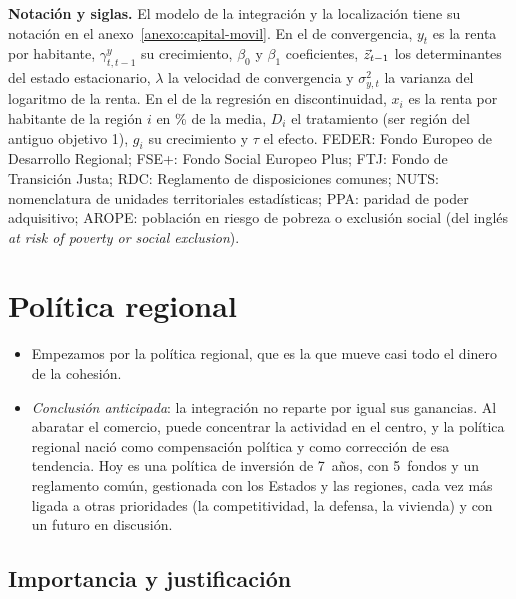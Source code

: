 \documentclass[11pt]{article}
\begin{document}
\begin{anotaciones}
\textbf{Notación y siglas.} El modelo de la integración y la localización tiene su notación en el anexo~\ref{anexo:capital-movil}. En el de convergencia, $y_t$ es la renta por habitante, $\gamma^{y}_{t,t-1}$ su crecimiento, $\beta_0$ y $\beta_1$ coeficientes, $\vec{z}_{t-1}$ los determinantes del estado estacionario, $\lambda$ la velocidad de convergencia y $\sigma_{y,t}^2$ la varianza del logaritmo de la renta. En el de la regresión en discontinuidad, $x_i$ es la renta por habitante de la región $i$ en \% de la media, $D_i$ el tratamiento (ser región del antiguo objetivo 1), $g_i$ su crecimiento y $\tau$ el efecto. FEDER: Fondo Europeo de Desarrollo Regional; FSE+: Fondo Social Europeo Plus; FTJ: Fondo de Transición Justa; RDC: Reglamento de disposiciones comunes; NUTS: nomenclatura de unidades territoriales estadísticas; PPA: paridad de poder adquisitivo; AROPE: población en riesgo de pobreza o exclusión social (del inglés \emph{at risk of poverty or social exclusion}).
\end{anotaciones}

\section{Política regional}\label{sec:regional}

\begin{itemize}
\item Empezamos por la política regional, que es la que mueve casi todo el dinero de la cohesión.
\item \emph{Conclusión anticipada}: la integración no reparte por igual sus ganancias. Al abaratar el comercio, puede concentrar la actividad en el centro, y la política regional nació como compensación política y como corrección de esa tendencia. Hoy es una política de inversión de 7~años, con 5~fondos y un reglamento común, gestionada con los Estados y las regiones, cada vez más ligada a otras prioridades (la competitividad, la defensa, la vivienda) y con un futuro en discusión.
\end{itemize}

\subsection{Importancia y justificación}\label{sec:justificacion}
\end{document}
